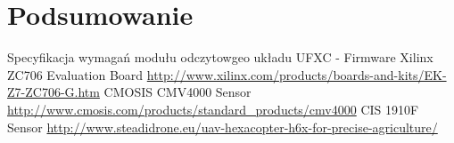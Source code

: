 \documentclass[a4paper,11pt,oneside]{article}  %
\begin{document}
\section{Podsumowanie}





\begin{thebibliography}{9}
 Specyfikacja wymagań modułu odczytowgeo układu UFXC - Firmware
 Xilinx ZC706 Evaluation Board \url{http://www.xilinx.com/products/boards-and-kits/EK-Z7-ZC706-G.htm}
 CMOSIS CMV4000 Sensor \url{http://www.cmosis.com/products/standard_products/cmv4000}
 CIS 1910F Sensor
 \url{http://www.steadidrone.eu/uav-hexacopter-h6x-for-precise-agriculture/}
\end{thebibliography}
\end{document}
